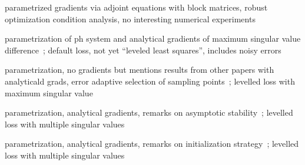 parametrized gradients via adjoint equations with block matrices, robust optimization condition analysis, no interesting numerical experiments~\cite{Günther2023}

parametrization of ph system and analytical gradients of maximum singular value difference~\cite{Schwerdtner2021}; default loss, not yet ``leveled least squares'', includes noisy errors

parametrization, no gradients but mentions results from other papers with analyticald grads, error adaptive selection of sampling points~\cite{SV2021}; levelled loss with maximum singular value

parametrization, analytical gradients, remarks on asymptotic stability~\cite{Schwerdtner2022}; levelled loss with multiple singular values

parametrization, analytical gradients, remarks on initialization strategy~\cite{Schwerdtner2023}; levelled loss with multiple singular values

